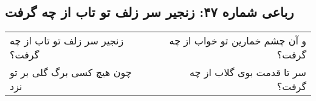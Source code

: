 \begin{center}
\section*{رباعی شماره ۴۷: زنجیر سر زلف تو تاب از چه گرفت}
\label{sec:047}
\begin{longtable}{l p{0.5cm} r}
زنجیر سر زلف تو تاب از چه گرفت؟
&&
و آن چشم خمارین تو خواب از چه گرفت؟
\\
چون هیچ کسی برگ گلی بر تو نزد
&&
سر تا قدمت بوی گلاب از چه گرفت؟
\\
\end{longtable}
\end{center}
